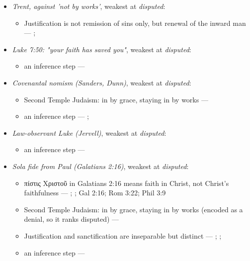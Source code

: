 \documentclass[11pt]{article}
\begin{document}
\begin{itemize}
\item \emph{Trent, against 'not by works'}, weakest at \emph{disputed}:
\begin{itemize}
\item Justification is not remission of sins only, but renewal of the inward man --- \cite[Trent, Session VI (1547), Decree on Justification, ch. 7]{tanner-decrees-1990}; \cite[Trent, Session VI (1547), canon 11]{tanner-decrees-1990}
\end{itemize}
\item \emph{Luke 7:50: "your faith has saved you"}, weakest at \emph{disputed}:
\begin{itemize}
\item an inference step --- \cite[Trent, Session VI (1547), canon 9]{tanner-decrees-1990}
\end{itemize}
\item \emph{Covenantal nomism (Sanders, Dunn)}, weakest at \emph{disputed}:
\begin{itemize}
\item Second Temple Judaism: in by grace, staying in by works --- \cite{sanders-paul-palestinian-judaism-1977}
\item an inference step --- \cite{dunn-new-perspective-2005}; \cite{wright-what-paul-said-1997}
\end{itemize}
\item \emph{Law-observant Luke (Jervell)}, weakest at \emph{disputed}:
\begin{itemize}
\item an inference step --- \cite{jervell-luke-people-god-1972}
\end{itemize}
\item \emph{Sola fide from Paul (Galatians 2:16)}, weakest at \emph{disputed}:
\begin{itemize}
\item πίστις Χριστοῦ in Galatians 2:16 means faith in Christ, not Christ's faithfulness --- \cite{dunn-once-more-pistis-christou-1991}; \cite{matlock-detheologizing-2000}; Gal 2:16; Rom 3:22; Phil 3:9
\item Second Temple Judaism: in by grace, staying in by works (encoded as a denial, so it ranks disputed) --- \cite{sanders-paul-palestinian-judaism-1977}
\item Justification and sanctification are inseparable but distinct --- \cite[XIII.1]{westminster-confession-1647}; \cite[XI.1]{westminster-confession-1647}; \cite[III.xi.6]{calvin-institutes-1960}
\item an inference step --- \cite[Trent, Session VI (1547), canon 9]{tanner-decrees-1990}

\end{itemize}
\end{itemize}
\end{document}
